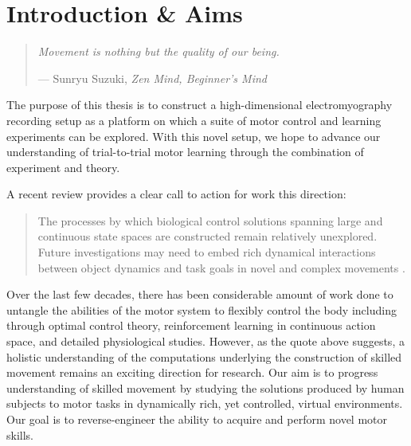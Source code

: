 \documentclass[../main.tex]{subfiles}
\begin{document}
\section{Introduction \& Aims}\label{sec:intro}

\begin{quote}
\emph{Movement is nothing but the quality of our being.}

--- Sunryu Suzuki, \emph{Zen Mind, Beginner's Mind}
\end{quote}

The purpose of this thesis is to construct a high-dimensional
electromyography recording setup as a platform on which a suite of motor
control and learning experiments can be explored. With this novel setup,
we hope to advance our understanding of trial-to-trial motor learning
through the combination of experiment and theory.

A recent review provides a clear call to action for work this direction:

\begin{quote}
The processes by which biological control solutions spanning large and
continuous state spaces are constructed remain relatively unexplored.
Future investigations may need to embed rich dynamical interactions
between object dynamics and task goals in novel and complex movements
\cite{McNamee2019}.
\end{quote}

Over the last few decades, there has been considerable amount of work
done to untangle the abilities of the motor system to flexibly control
the body including through optimal control theory\cite{Todorov2004},
reinforcement learning in continuous action
space\cite{koberReinforcementLearningRobotics2013}, and detailed
physiological studies\cite{sauerbreiCorticalPatternGeneration2019}.
However, as the quote above suggests, a holistic understanding of the
computations underlying the construction of skilled movement remains an
exciting direction for research. Our aim is to progress understanding of
skilled movement by studying the solutions produced by human subjects to
motor tasks in dynamically rich, yet controlled, virtual environments.
Our goal is to reverse-engineer the ability to acquire and perform novel
motor skills.
\end{document}

